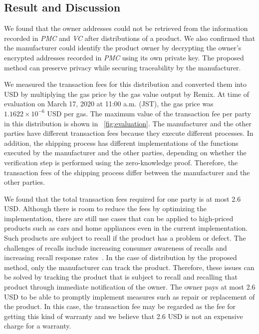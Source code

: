 \documentclass[conference]{IEEEtran}
\begin{document}
\subsection{Result and Discussion}
We found that the owner addresses could not be retrieved from the information recorded in \textit{PMC} and \textit{VC} after distributions of a product.
We also confirmed that the manufacturer could identify the product owner by decrypting the owner's encrypted addresses recorded in \textit{PMC} using its own private key.
The proposed method can preserve privacy while 
securing traceability by the manufacturer.

We measured the transaction fees for this distribution
and converted them into USD by multiplying the gas price by the gas value output by Remix.
At time of evaluation on March 17, 2020 at 11:00 a.m. (JST), the gas price was $1.1622 \times 10^{-6}$ USD per gas.
The maximum value of the transaction fee per party in this distribution is shown in \figurename~\ref{fig:evaluation}.
The manufacturer and the other parties have different transaction fees because they execute different processes.
In addition, the shipping process has different implementations of the functions executed by the manufacturer and the other parties, depending on whether the verification step is performed using the zero-knowledge proof.
Therefore, the transaction fees of the shipping process differ between the manufacturer and the other parties.

We found that the total transaction fees required for one party is at most 2.6 USD. 
Although there is room to reduce the fees by optimizing the implementation, there are still use cases that can be applied to high-priced products such as cars and home appliances even in the current implementation.
Such products are subject to recall if the product has a problem or defect.
The challenges of recalls include increasing consumer awareness of recalls and increasing recall response rates~\cite{OECD2018}.
In the case of distribution by the proposed method, only the manufacturer can track the product.
Therefore, these issues can be solved by tracking the product that is subject to recall and recalling that product through immediate notification of the owner.
The owner pays at most 2.6 USD to be able to promptly implement measures such as repair or replacement of the product. In this case, the transaction fee may be regarded as the fee for getting this kind of warranty and we believe that 2.6 USD is not an expensive charge for a warranty.
\end{document}

